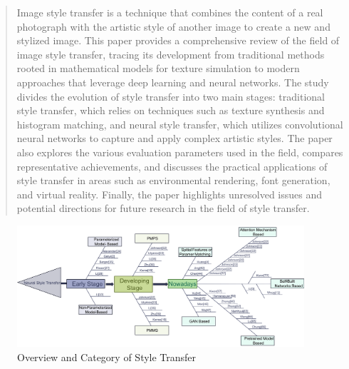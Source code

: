 \documentclass[preprint,12pt]{elsarticle}
\begin{document}
\begin{frontmatter}
\begin{abstract}
Image style transfer is a technique that combines the content of a real photograph with the artistic style of another image to create a new and stylized image. This paper provides a comprehensive review of the field of image style transfer, tracing its development from traditional methods rooted in mathematical models for texture simulation to modern approaches that leverage deep learning and neural networks. The study divides the evolution of style transfer into two main stages: traditional style transfer, which relies on techniques such as texture synthesis and histogram matching, and neural style transfer, which utilizes convolutional neural networks to capture and apply complex artistic styles. The paper also explores the various evaluation parameters used in the field, compares representative achievements, and discusses the practical applications of style transfer in areas such as environmental rendering, font generation, and virtual reality. Finally, the paper highlights unresolved issues and potential directions for future research in the field of style transfer.
\end{abstract}

\begin{graphicalabstract}
  \begin{figure}[t]%
    \centering%
    \includegraphics[width=0.95\textwidth]{fig/overview.pdf}
    \caption{Overview and Category of Style Transfer}\label{fig1}
    \end{figure}
  \end{graphicalabstract}


\end{frontmatter}
\end{document}
